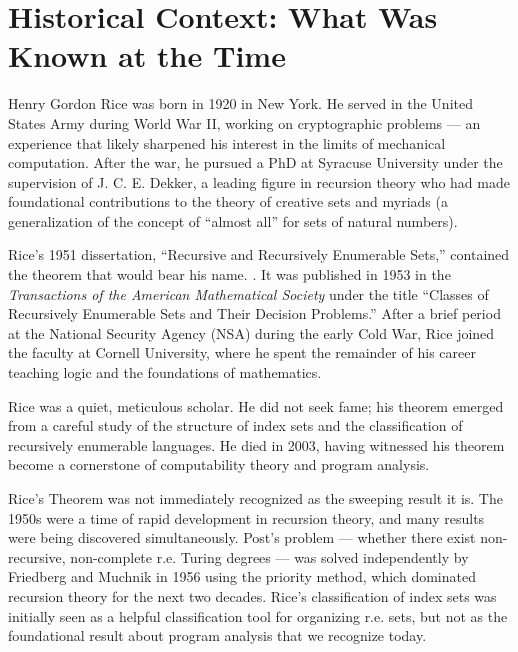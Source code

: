 \section{Historical Context: What Was Known at the Time}
\label{sec:rice:context}

Henry Gordon Rice was born in 1920 in New York. He served in the United States Army during World War II, working on cryptographic problems --- an experience that likely sharpened his interest in the limits of mechanical computation. After the war, he pursued a PhD at Syracuse University under the supervision of J. C. E. Dekker, a leading figure in recursion theory who had made foundational contributions to the theory of creative sets and myriads (a generalization of the concept of ``almost all'' for sets of natural numbers).

Rice's 1951 dissertation, ``Recursive and Recursively Enumerable Sets,'' contained the theorem that would bear his name. \cite{rice1953}. It was published in 1953 in the \emph{Transactions of the American Mathematical Society} under the title ``Classes of Recursively Enumerable Sets and Their Decision Problems.'' After a brief period at the National Security Agency (NSA) during the early Cold War, Rice joined the faculty at Cornell University, where he spent the remainder of his career teaching logic and the foundations of mathematics.

Rice was a quiet, meticulous scholar. He did not seek fame; his theorem emerged from a careful study of the structure of index sets and the classification of recursively enumerable languages. He died in 2003, having witnessed his theorem become a cornerstone of computability theory and program analysis.

Rice's Theorem was not immediately recognized as the sweeping result it is. The 1950s were a time of rapid development in recursion theory, and many results were being discovered simultaneously. Post's problem --- whether there exist non-recursive, non-complete r.e. Turing degrees --- was solved independently by Friedberg and Muchnik in 1956 using the priority method, which dominated recursion theory for the next two decades. Rice's classification of index sets was initially seen as a helpful classification tool for organizing r.e. sets, but not as the foundational result about program analysis that we recognize today.

